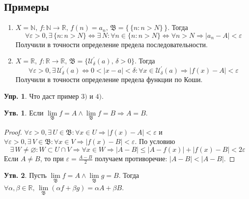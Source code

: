 \documentclass[12pt]{article}
\theoremstyle{definition}
\newtheorem{prop}{Утв.}
\newtheorem{exrc}{Упр.}
\begin{document}
\subsection*{Примеры}
\begin{enumerate}[label={\arabic*)}]
	\item $X = \mathbb{N}, \, f\colon \mathbb{N} \to \mathbb{R}, \, f(n) = a_n, \, \mathfrak{B} = \{\,\{n \colon n >N \} \,\}$. Тогда 
	$$\forall \varepsilon > 0, \exists \, \{n \colon n >N \} \Leftrightarrow \exists \, N \colon \forall n \in \{n \colon n >N \} \Leftrightarrow \forall n > N \Rightarrow |a_n - A| < \varepsilon$$
	Получили в точности определение предела последовательности.
	
	\item $X = \mathbb{R}, \, f\colon \mathbb{R} \to \mathbb{R}, \, \mathfrak{B} = \{ \mathcal{U}_\delta^\prime(a), \, \delta > 0  \}$. Тогда
	$$\forall \varepsilon > 0, \exists \, \mathcal{U}_\delta^\prime(a) \Leftrightarrow 0 < |x-a| < \delta \colon \forall x \in \mathcal{U}_\delta^\prime(a) \Rightarrow |f(x) - A| < \varepsilon$$
	Получили в точности определение предела функции по Коши.
\end{enumerate}

\begin{exrc}
	Что даст пример $3)$ и $4)$.
\end{exrc}

\begin{prop}
	Если $\lim\limits_{\mathfrak{B}}f = A \wedge \lim\limits_{\mathfrak{B}}f = B \Rightarrow A = B$.
\end{prop}
\begin{proof}
	$\forall \varepsilon > 0, \exists \, U \in \mathfrak{B} \colon \forall x \in U \Rightarrow |f(x) - A| < \varepsilon$ и $\forall \varepsilon > 0, \exists \, V \in \mathfrak{B} \colon \forall x \in V \Rightarrow |f(x) - B| < \varepsilon$. 
	По условию 
	$$\exists \, W \neq \varnothing \colon W \subset U \cap V \Rightarrow \forall x \in W \Rightarrow |A - B| \leq |A - f(x)| + |f(x) - B| < 2 \varepsilon$$ 
	Если $A \neq B$, то при $\varepsilon = \frac{A - B}{2}$ получаем противоречие: $|A-B| < |A -B|$.
\end{proof}

\begin{prop}
	Пусть $\lim\limits_{\mathfrak{B}}f = A \wedge \lim\limits_{\mathfrak{B}}g = B$. Тогда $\forall \alpha, \beta \in \mathbb{R}, \, \lim\limits_{\mathfrak{B}}(\alpha f + \beta g) = \alpha A + \beta B$.
\end{prop}
\end{document}
